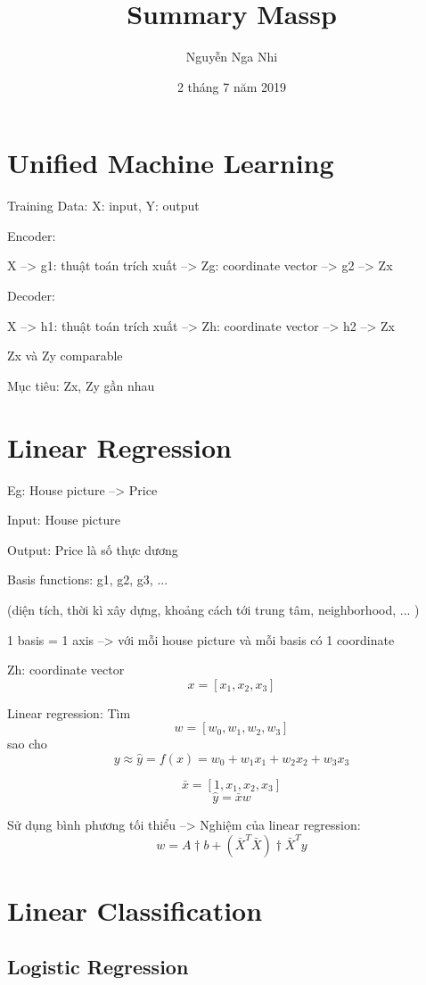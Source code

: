 \documentclass{article}
\title{Summary Massp}
\author{Nguyễn Nga Nhi}
\date{2 tháng 7 năm 2019}
\begin{document}
\maketitle

\section{Unified Machine Learning}

Training Data: X: input, Y: output

Encoder:

X --> g1: thuật toán trích xuất --> Zg: coordinate vector --> g2 --> Zx

Decoder:

X --> h1: thuật toán trích xuất --> Zh: coordinate vector --> h2 --> Zx

Zx và Zy comparable

Mục tiêu: Zx, Zy gần nhau

\section{Linear Regression}

Eg: House picture --> Price

Input: House picture

Output: Price là số thực dương

Basis functions: g1, g2, g3, ...

(diện tích, thời kì xây dựng, khoảng cách tới trung tâm, neighborhood, ... )

1 basis = 1 axis --> với mỗi house picture và mỗi basis có 1 coordinate

Zh: coordinate vector
$$x = [x_1, x_2, x_3]$$

Linear regression:
Tìm $$w = [w_0, w_1, w_2, w_3]$$
sao cho $$y \approx \hat{y} = f(x) = w_0 + w_1 x_1 + w_2 x_2 + w_3 x_3$$

$$\bar{x} = [1, x_1, x_2, x_3]$$
$$\hat{y} = \bar{x} w$$

Sử dụng bình phương tối thiểu --> Nghiệm của linear regression:
$$w = A\dagger b + (\bar{X}^T\bar{X})\dagger\bar{X}^T y $$

\section{Linear Classification}

\subsection{Logistic Regression}
\end{document}
